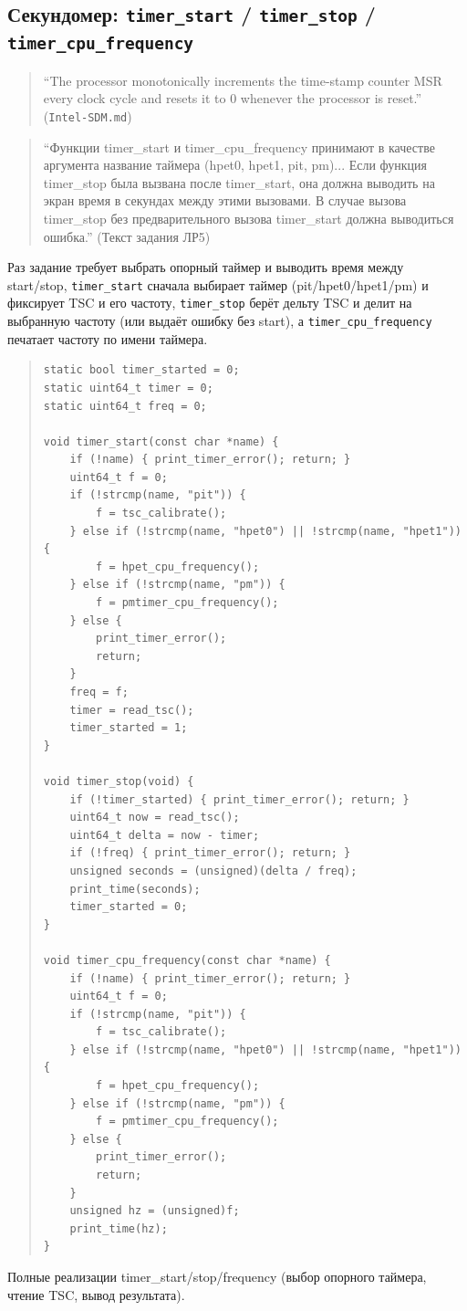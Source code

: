 \documentclass[a4paper,12pt]{article}
\begin{document}
\subsection{Секундомер: \texttt{timer\_start} / \texttt{timer\_stop} / \texttt{timer\_cpu\_frequency}}
\begin{quote}
``The processor monotonically increments the time-stamp counter MSR every clock cycle and resets it to 0 whenever the processor is reset.'' (\texttt{Intel-SDM.md})
\end{quote}
\begin{quote}
``Функции timer_start и timer_cpu_frequency принимают в качестве аргумента название таймера (hpet0, hpet1, pit, pm)... Если функция timer_stop была вызвана после timer_start, она должна выводить на экран время в секундах между этими вызовами. В случае вызова timer_stop без предварительного вызова timer_start должна выводиться ошибка.'' (Текст задания ЛР5)
\end{quote}
Раз задание требует выбрать опорный таймер и выводить время между start/stop, \texttt{timer\_start} сначала выбирает таймер (pit/hpet0/hpet1/pm) и фиксирует TSC и его частоту, \texttt{timer\_stop} берёт дельту TSC и делит на выбранную частоту (или выдаёт ошибку без start), а \texttt{timer\_cpu\_frequency} печатает частоту по имени таймера.
\begin{quote}\begin{verbatim}
static bool timer_started = 0;
static uint64_t timer = 0;
static uint64_t freq = 0;

void timer_start(const char *name) {
    if (!name) { print_timer_error(); return; }
    uint64_t f = 0;
    if (!strcmp(name, "pit")) {
        f = tsc_calibrate();
    } else if (!strcmp(name, "hpet0") || !strcmp(name, "hpet1")) {
        f = hpet_cpu_frequency();
    } else if (!strcmp(name, "pm")) {
        f = pmtimer_cpu_frequency();
    } else {
        print_timer_error();
        return;
    }
    freq = f;
    timer = read_tsc();
    timer_started = 1;
}

void timer_stop(void) {
    if (!timer_started) { print_timer_error(); return; }
    uint64_t now = read_tsc();
    uint64_t delta = now - timer;
    if (!freq) { print_timer_error(); return; }
    unsigned seconds = (unsigned)(delta / freq);
    print_time(seconds);
    timer_started = 0;
}

void timer_cpu_frequency(const char *name) {
    if (!name) { print_timer_error(); return; }
    uint64_t f = 0;
    if (!strcmp(name, "pit")) {
        f = tsc_calibrate();
    } else if (!strcmp(name, "hpet0") || !strcmp(name, "hpet1")) {
        f = hpet_cpu_frequency();
    } else if (!strcmp(name, "pm")) {
        f = pmtimer_cpu_frequency();
    } else {
        print_timer_error();
        return;
    }
    unsigned hz = (unsigned)f;
    print_time(hz);
}
\end{verbatim}\end{quote}
Полные реализации timer\_start/stop/frequency (выбор опорного таймера, чтение TSC, вывод результата).
\end{document}
